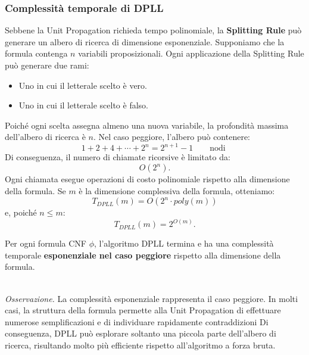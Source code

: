 \subsubsection*{Complessità temporale di DPLL}
Sebbene la Unit Propagation richieda
tempo polinomiale, la \textbf{Splitting Rule}
può generare un albero di ricerca
di dimensione esponenziale.
Supponiamo che la formula contenga $n$
variabili proposizionali.
Ogni applicazione della Splitting Rule
può generare due rami:
\begin{itemize}
    \item Uno in cui il letterale scelto è vero.
    \item Uno in cui il letterale scelto è falso.
\end{itemize}
Poiché ogni scelta assegna almeno una nuova
variabile, la profondità massima dell'albero
di ricerca è $n$.
Nel caso peggiore, l'albero può contenere:
\[
1+2+4+\cdots+2^n=2^{n+1}-1    \qquad \text{nodi }
\]
Di conseguenza, il numero di chiamate
ricorsive è limitato da:
\[
\boxed{O(2^n)}.
\]
Ogni chiamata esegue operazioni di costo
polinomiale rispetto alla dimensione
della formula.
Se $m$ è la dimensione complessiva
della formula, otteniamo:
\[
\boxed{
T_{DPLL}(m)=O(2^n\cdot poly(m))
}
\]
e, poiché $n\le m$:
\[
\boxed{
T_{DPLL}(m)=2^{O(m)}.
}
\]
\colorbox{SALZO}{\parbox{\dimexpr\linewidth-2\fboxsep}{
\begin{theorem}
Per ogni formula CNF $\phi$, l'algoritmo
DPLL termina e ha una complessità
temporale \textbf{esponenziale nel caso peggiore}
rispetto alla dimensione della formula.
\end{theorem}
}}\smallskip\\
\textit{Osservazione.}
La complessità esponenziale rappresenta
il caso peggiore.
In molti casi, la struttura della formula
permette alla Unit Propagation di effettuare
numerose semplificazioni e di individuare
rapidamente contraddizioni
Di conseguenza, DPLL può esplorare soltanto
una piccola parte dell'albero di ricerca,
risultando molto più efficiente rispetto
all'algoritmo a forza bruta.

